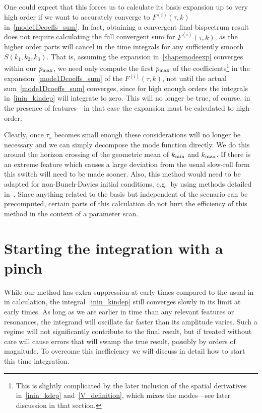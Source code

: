 One could expect that this forces us to calculate its basis expansion
up to very high order if we want to accurately converge to $F^{(i)}(\tau, k)$
in~\eqref{mode1Dcoeffs_sum}.
In fact, obtaining a convergent final bispectrum result
does not require calculating the full convergent sum
for $F^{(i)}(\tau, k)$,
as the higher order parts will cancel in the time integrals
for any sufficiently smooth $S(k_1,k_2,k_3)$.
That is, assuming the expansion in~\eqref{shapemodeexp} converges within our $p_\text{max}$,
we need only compute the first $p_\text{max}$ of the coefficients\footnote{
    This is slightly complicated by the later inclusion of the spatial derivatives in~\eqref{inin_kdep}
    and~\eqref{V_definition}, which mixes the modes---see later discussion in that section.
}
in the expansion~\eqref{mode1Dcoeffs_sum} of the $F^{(i)}(\tau, k)$,
not until the actual sum~\eqref{mode1Dcoeffs_sum} converges, since for high enough orders the integrals
in~\eqref{inin_kindep} will integrate to zero.
This will no longer be true, of course, in the presence of features---in
that case the expansion must be calculated to high order.


Clearly, once $\tau_s$ becomes small enough these considerations will no longer be necessary
and we can simply decompose the mode function directly.
We do this around the horizon crossing of the geometric mean of ${k_\text{min}}$ and ${k_\text{max}}$.
If there is an extreme feature which causes a large deviation from the usual slow-roll form
this switch will need to be made sooner. 
Also, this method would need to be adapted for non-Bunch-Davies initial conditions,
e.g.\ by using methods detailed in~\cite{RKWKB, oscode_2019, oscode_2020}.
Since anything related to the basis but independent of the scenario can be
precomputed, certain parts of this calculation do not hurt the efficiency of this
method in the context of a parameter scan.


\section{Starting the integration with a pinch}\label{sec:starting}
While our method has extra suppression at early times compared to the
usual in-in calculation, the integral~\eqref{inin_kindep} still converges slowly
in its limit at early times. 
As long as we are earlier in time than any relevant features or resonances,
the integrand will oscillate far faster than its amplitude varies.
Such a regime will not significantly
contribute to the final result, but if treated without care will cause errors that will
swamp the true result, possibly by orders of magnitude.
To overcome this inefficiency we will discuss in detail
how to start this time integration.


